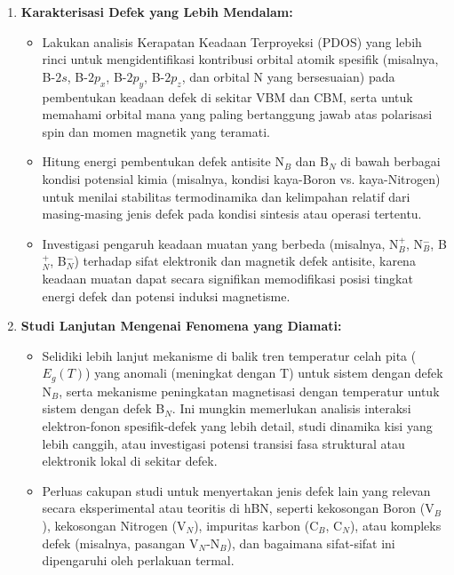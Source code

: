 \begin{enumerate}
    \item \textbf{Karakterisasi Defek yang Lebih Mendalam:}
    \begin{itemize}
        \item Lakukan analisis Kerapatan Keadaan Terproyeksi (PDOS) yang lebih rinci untuk mengidentifikasi kontribusi orbital atomik spesifik (misalnya, B-$2s$, B-$2p_x$, B-$2p_y$, B-$2p_z$, dan orbital N yang bersesuaian) pada pembentukan keadaan defek di sekitar VBM dan CBM, serta untuk memahami orbital mana yang paling bertanggung jawab atas polarisasi spin dan momen magnetik yang teramati.
        \item Hitung energi pembentukan defek antisite N$_B$ dan B$_N$ di bawah berbagai kondisi potensial kimia (misalnya, kondisi kaya-Boron vs. kaya-Nitrogen) untuk menilai stabilitas termodinamika dan kelimpahan relatif dari masing-masing jenis defek pada kondisi sintesis atau operasi tertentu.
        \item Investigasi pengaruh keadaan muatan yang berbeda (misalnya, N$_B^+$, N$_B^-$, B$_N^+$, B$_N^-$) terhadap sifat elektronik dan magnetik defek antisite, karena keadaan muatan dapat secara signifikan memodifikasi posisi tingkat energi defek dan potensi induksi magnetisme.
    \end{itemize}

    \item \textbf{Studi Lanjutan Mengenai Fenomena yang Diamati:}
    \begin{itemize}
        \item Selidiki lebih lanjut mekanisme di balik tren temperatur celah pita ($E_g(T)$) yang anomali (meningkat dengan T) untuk sistem dengan defek N$_B$, serta mekanisme peningkatan magnetisasi dengan temperatur untuk sistem dengan defek B$_N$. Ini mungkin memerlukan analisis interaksi elektron-fonon spesifik-defek yang lebih detail, studi dinamika kisi yang lebih canggih, atau investigasi potensi transisi fasa struktural atau elektronik lokal di sekitar defek.
        \item Perluas cakupan studi untuk menyertakan jenis defek lain yang relevan secara eksperimental atau teoritis di hBN, seperti kekosongan Boron (V$_B$), kekosongan Nitrogen (V$_N$), impuritas karbon (C$_B$, C$_N$), atau kompleks defek (misalnya, pasangan V$_N$-N$_B$), dan bagaimana sifat-sifat ini dipengaruhi oleh perlakuan termal.
    \end{itemize}


\end{enumerate}
